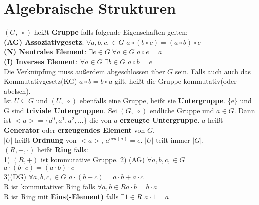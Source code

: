 \documentclass[11pt]{article}
\begin{document}
\section{Algebraische Strukturen}
$(G,\; \circ)$ hei{\ss}t {\bfseries Gruppe} falls folgende Eigenschaften gelten:\\
{\bfseries (AG) Assoziativgesetz}: $\forall a,b,c, \in G$ \hspace{5mm} $a \circ (b \circ c) = (a \circ b) \circ c$\\
{\bfseries (N) Neutrales Element}: $\exists e \in G\; \forall a \in G$\hspace{5mm} $a \circ e = a$\\
{\bfseries (I) Inverses Element}: $\forall a \in G\; \exists b \in G$\hspace{5mm} $a \circ b = e$\\
Die Verkn{\"u}pfung muss au{\ss}erdem abgeschlossen {\"u}ber $G$ sein.
Falls auch auch das Kommutativgesetz(KG) $a \circ b = b \circ a$ gilt, hei{\ss}t die Gruppe kommutativ(oder abelsch).\\
Ist $U \subseteq G$ und $(U,\; \circ)$ ebenfalls eine Gruppe, hei{\ss}t sie {\bfseries Untergruppe}. \{e\} und G sind {\bfseries triviale Untergruppen}.
Sei $(G,\; \circ)$ endliche Gruppe und $a\in G$. Dann ist $<a> = \{a^0, a^1, a^2,...\}$ die von $a$ {\bfseries erzeugte Untergruppe}. $a$ hei{\ss}t {\bfseries Generator} oder {\bfseries erzeugendes Element} von $G$.\\
$\mathopen| U \mathclose|$ hei{\ss}t {\bfseries Ordnung} von $<a>$, $a^{ord(a)}=e$. $\mathopen| U \mathclose|$ teilt immer $\mathopen| G \mathclose|$.\\
$(R,+,\cdot)$ hei{\ss}t {\bfseries Ring} falls:\\
1) $(R,+)$ ist kommutative Gruppe. \hspace{2mm} 2) (AG) $\forall a,b,c, \in G$ \hspace{3mm} $a \cdot (b \cdot c) = (a \cdot b) \cdot c$ \\
3)(DG) $\forall a,b,c, \in G$ \hspace{3mm} $a \cdot (b + c) = a \cdot b + a \cdot c$\\
R ist kommutativer Ring falls $\forall a,b \in R$\hspace{3mm}$a \cdot b = b \cdot a$\\
R ist Ring mit {\bfseries Eins(-Element)} falls $\exists 1 \in R$\hspace{3mm} $a\cdot 1 = a$
\end{document}
